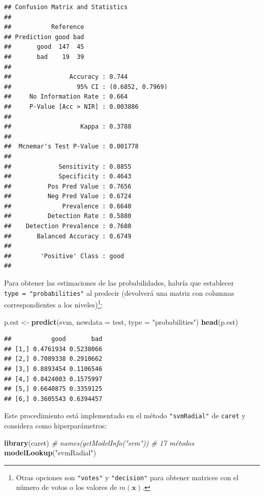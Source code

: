 \documentclass[
  spanish,
]{book}
\newenvironment{Shaded}{\begin{snugshade}}{\end{snugshade}}
\newcommand{\CommentTok}[1]{\textcolor[rgb]{0.56,0.35,0.01}{\textit{#1}}}
\newcommand{\DataTypeTok}[1]{\textcolor[rgb]{0.13,0.29,0.53}{#1}}
\newcommand{\KeywordTok}[1]{\textcolor[rgb]{0.13,0.29,0.53}{\textbf{#1}}}
\newcommand{\NormalTok}[1]{#1}
\newcommand{\StringTok}[1]{\textcolor[rgb]{0.31,0.60,0.02}{#1}}
\theoremstyle{break}
\theoremstyle{definition}
\theoremstyle{definition}
\theoremstyle{definition}
\theoremstyle{remark}
\begin{document}
\begin{verbatim}
## Confusion Matrix and Statistics
## 
##           Reference
## Prediction good bad
##       good  147  45
##       bad    19  39
##                                           
##                Accuracy : 0.744           
##                  95% CI : (0.6852, 0.7969)
##     No Information Rate : 0.664           
##     P-Value [Acc > NIR] : 0.003886        
##                                           
##                   Kappa : 0.3788          
##                                           
##  Mcnemar's Test P-Value : 0.001778        
##                                           
##             Sensitivity : 0.8855          
##             Specificity : 0.4643          
##          Pos Pred Value : 0.7656          
##          Neg Pred Value : 0.6724          
##              Prevalence : 0.6640          
##          Detection Rate : 0.5880          
##    Detection Prevalence : 0.7680          
##       Balanced Accuracy : 0.6749          
##                                           
##        'Positive' Class : good            
## 
\end{verbatim}

Para obtener las estimaciones de las probabilidades, habría que establecer
\texttt{type\ =\ "probabilities"} al predecir (devolverá una matriz con columnas
correspondientes a los niveles)\footnote{Otras opciones son \texttt{"votes"} y \texttt{"decision"} para obtener matrices con el número de votos o los valores de \(m(\mathbf{x})\).}:

\begin{Shaded}
\begin{Highlighting}[]
\NormalTok{p.est <-}\StringTok{ }\KeywordTok{predict}\NormalTok{(svm, }\DataTypeTok{newdata =}\NormalTok{ test, }\DataTypeTok{type =} \StringTok{"probabilities"}\NormalTok{)}
\KeywordTok{head}\NormalTok{(p.est)}
\end{Highlighting}
\end{Shaded}

\begin{verbatim}
##           good       bad
## [1,] 0.4761934 0.5238066
## [2,] 0.7089338 0.2910662
## [3,] 0.8893454 0.1106546
## [4,] 0.8424003 0.1575997
## [5,] 0.6640875 0.3359125
## [6,] 0.3605543 0.6394457
\end{verbatim}

Este procedimiento está implementado en el método \texttt{"svmRadial"} de \texttt{caret} y considera como hiperparámetros:

\begin{Shaded}
\begin{Highlighting}[]
\KeywordTok{library}\NormalTok{(caret)}
\CommentTok{# names(getModelInfo("svm")) # 17 métodos}
\KeywordTok{modelLookup}\NormalTok{(}\StringTok{"svmRadial"}\NormalTok{)}
\end{Highlighting}
\end{Shaded}
\end{document}
